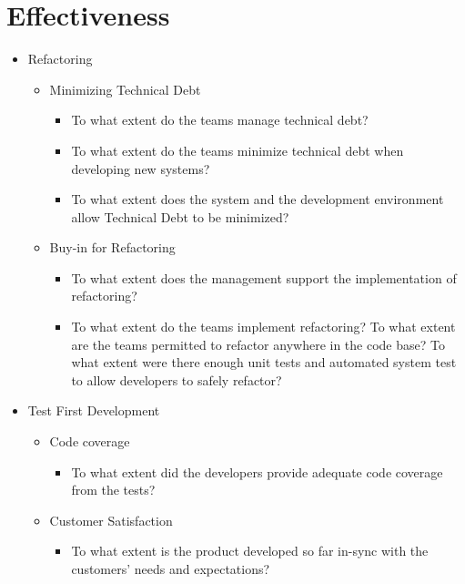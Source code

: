 \section{Effectiveness}

\begin{itemize}
	\item Refactoring 
		\begin{itemize}
			\item Minimizing Technical Debt 
				\begin{itemize}
					\item To what extent do the teams manage technical debt? 
					\item To what extent do the teams minimize technical debt when developing new systems? 
					\item To what extent does the system and the development environment allow Technical Debt to be minimized? 
				\end{itemize}
			\item Buy-in for Refactoring 
				\begin{itemize}
					\item To what extent does the management support the implementation of refactoring? 
					\item To what extent do the teams implement refactoring? 
					\addition To what extent are the teams permitted to refactor anywhere in the code base?			
					\addition To what extent were there enough unit tests and automated system test to allow developers to safely refactor?					
				\end{itemize}
		\end{itemize}
	\item Test First Development
		\begin{itemize}
			\item Code coverage
				\begin{itemize}
					\item To what extent did the developers provide adequate code coverage from the tests?
				\end{itemize}
		\end{itemize}
		\begin{itemize}
			\item Customer Satisfaction
				\begin{itemize}
					\item To what extent is the product developed so far in-sync with the customers' needs and expectations?

\end{itemize}
\end{itemize}
\end{itemize}
